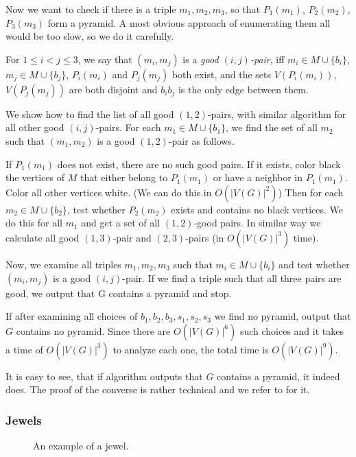 \begin{algtext}
Now we want to check if there is a triple $m_1, m_2, m_3$, so that $P_1(m_1)$, $P_2(m_2)$, $P_3(m_3)$ form a pyramid. A most obvious approach of enumerating them all would be too slow, so we do it carefully.

For $1 \leq i < j \leq 3$, we say that $(m_i, m_j)$ is a \emph{good $(i, j)$-pair}, iff $m_i \in M \cup \{b_i\}$, $m_j \in M \cup \{b_j\}$, $P_i(m_i)$ and $P_j(m_j)$ both exist, and the sets $V(P_i(m_i))$,$V(P_j(m_j))$ are both disjoint and $b_ib_j$ is the only edge between them.

We show how to find the list of all good $(1, 2)$-pairs, with similar algorithm for all other good $(i, j)$-pairs. For each $m_1 \in M \cup \{b_1\}$, we find the set of all $m_2$ such that $(m_1, m_2)$ is a good $(1,2)$-pair as follows.

If $P_1(m_1)$ does not exist, there are no such good pairs. If it exists, color black the vertices of $M$ that either belong to $P_1(m_1)$ or have a neighbor in $P_1(m_1)$. Color all other vertices white. (We can do this in $O(|V(G)|^2)$) Then for each $m_2 \in M \cup \{b_2\}$, test whether $P_2(m_2)$ exists and contains no black vertices. We do this for all $m_1$ and get a set of all $(1,2)$-good pairs. In similar way we calculate all good $(1,3)$-pair and $(2,3)$-pairs (in $O(|V(G)|^3)$ time).

Now, we examine all triples $m_1, m_2, m_3$ such that $m_i \in M \cup \{b_i\}$ and test whether $(m_i, m_j)$ is a good $(i, j)$-pair. If we find a triple such that all three pairs are good, we output that G contains a pyramid and stop.

If after examining all choices of $b_1, b_2, b_3, s_1, s_2, s_3$ we find no pyramid, output that $G$ contains no pyramid. Since there are $O(|V(G)|^6)$ such choices and it takes a time of $O(|V(G)|^3)$ to analyze each one, the total time is $O(|V(G)|^9)$.
\end{algtext}

It is easy to see, that if algorithm outputs that $G$ contains a pyramid, it indeed does. The proof of the converse is rather technical and we refer to \cite{MC05} for it.

\subsubsection{Jewels}

\begin{wrapfigure}{r}{0.35\textwidth}
	
	\caption{An example of a jewel.}
	\vspace{-1.5cm}
\end{wrapfigure}


